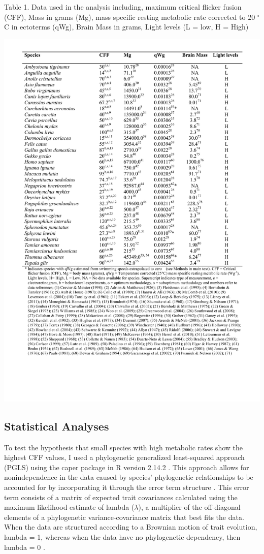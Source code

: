 \begin{table}[!Hp]
  \caption[ ]{Table 1. Data used in the analysis including, maximum critical flicker fusion (CFF), Mass in grams (Mg), mass specific resting metabolic rate corrected to 20 $^{\circ}$C in ectoterms (qWg), Brain Mass in grams, Light levels (L = low, H = High)}
  \label{tbl:Table 1.}
  \includegraphics[width=1.0\linewidth]{ch2-time/Table_1}
\end{table}


\subsection{Statistical Analyses}
To test the hypothesis that small species with high metabolic rates show the highest CFF values, I used a phylogenetic generalized least-squared approach (PGLS) using the caper package \citep{orme2011caper} in R version 2.14.2 \citep{RCran}. This approach allows for nonindependence in the data caused by species' phylogenetic relationships to be accounted for by incorporating it through the error term structure \citep{pagel1999inferring,rohlf2001comparative}. This error term consists of a matrix of expected trait covariances calculated using the maximum likelihood estimate of lambda ($\lambda$), a multiplier of the off-diagonal elements of a phylogenetic variance-covariance matrix that best fits the data. When the data are structured according to a Brownian motion of trait evolution, lambda = 1, whereas when the data have no phylogenetic dependency, then lambda = 0 \citep{pagel1999inferring}.


